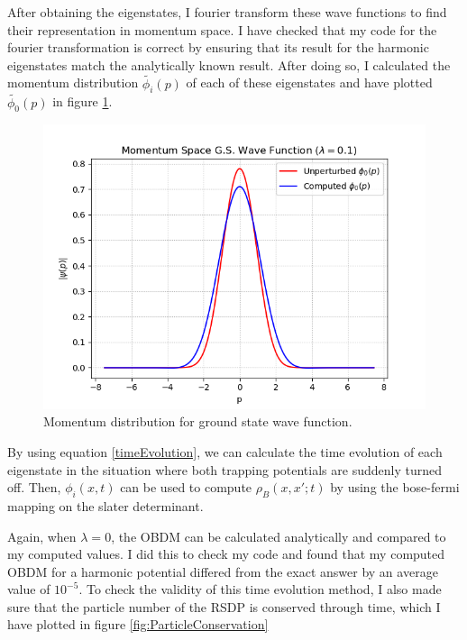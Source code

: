 \documentclass[onecolumn,english,aps,pra]{revtex4}
\begin{document}
After obtaining the eigenstates, I fourier transform these wave functions to find their representation in momentum space. I have checked that my code for the fourier transformation is correct by ensuring that its result for the harmonic eigenstates match the analytically known result. After doing so, I calculated the momentum distribution $\widetilde{\phi_i}(p)$ of each of these eigenstates and have plotted $\widetilde{\phi_0}(p)$ in figure \ref{fig:MomentumDist}.
%
\begin{figure}[H]
\center
\includegraphics[scale=0.8]{../Plots/Anharmonic/GSMomentumDist}
\caption{Momentum distribution for ground state wave function.}
\label{fig:MomentumDist}
\end{figure}
%
By using equation \ref{timeEvolution}, we can calculate the time evolution of each eigenstate in the situation where both trapping potentials are suddenly turned off. Then, $\phi_i(x,t)$ can be used to compute $\rho_B(x, x';t)$ by using the bose-fermi mapping on the slater determinant. 

Again, when $\lambda =0$, the OBDM can be calculated analytically and compared to my computed values. I did this to check my code and found that my computed OBDM for a harmonic potential differed from the exact answer by an average value of $10^{-5}$.
To check the validity of this time evolution method, I also made sure that the particle number of the RSDP is conserved through time, which I have plotted in figure \ref{fig:ParticleConservation}
\end{document}
